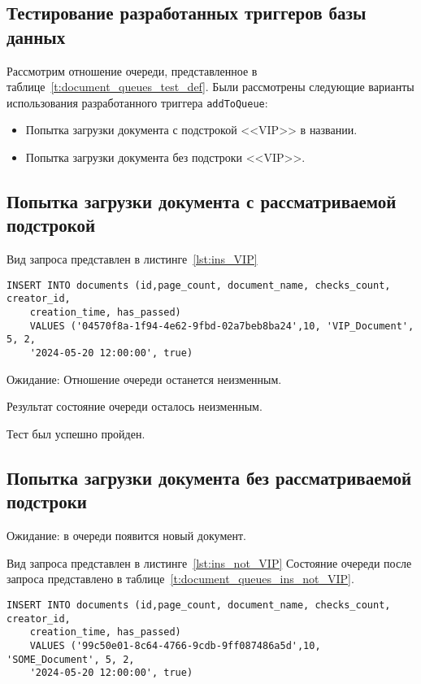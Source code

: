 \subsection{Тестирование разработанных триггеров базы данных}
Рассмотрим отношение очереди, представленное в
таблице~\ref{t:document_queues_test_def}.
Были рассмотрены следующие варианты использования разработанного триггера
\texttt{addToQueue}:
\begin{itemize}
	\item Попытка загрузки документа с подстрокой <<VIP>> в названии.
	\item Попытка загрузки документа  без подстроки <<VIP>>.
\end{itemize}

\subsection{Попытка загрузки документа с рассматриваемой подстрокой}

Вид запроса представлен в листинге~\ref{lst:ins_VIP}
\begin{lstlisting}[caption=Запрос загрузки документа с подстрокой
	<<VIP>>,frame=tlrb,label=lst:ins_VIP]
	INSERT INTO documents (id,page_count, document_name, checks_count, creator_id,
	creation_time, has_passed)
	VALUES ('04570f8a-1f94-4e62-9fbd-02a7beb8ba24',10, 'VIP_Document', 5, 2,
	'2024-05-20 12:00:00', true)
\end{lstlisting}

Ожидание: Отношение очереди останется неизменным.

Результат состояние очереди осталось неизменным.

Тест был успешно пройден.
\subsection{Попытка загрузки документа без рассматриваемой подстроки}
Ожидание: в очереди появится новый документ.

Вид запроса представлен в листинге~\ref{lst:ins_not_VIP}
Состояние очереди после запроса представлено в
таблице~\ref{t:document_queues_ins_not_VIP}.
\newpage
\begin{lstlisting}[caption=Запрос загрузки документа без подстоки
	<<VIP>>,frame=tlrb,label=lst:ins_not_VIP]
	INSERT INTO documents (id,page_count, document_name, checks_count, creator_id,
	creation_time, has_passed)
	VALUES ('99c50e01-8c64-4766-9cdb-9ff087486a5d',10, 'SOME_Document', 5, 2,
	'2024-05-20 12:00:00', true)
\end{lstlisting}

